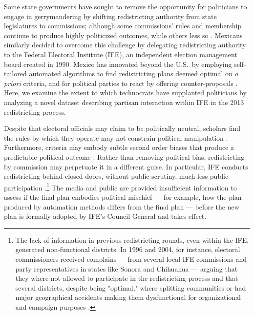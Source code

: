 \documentclass[letter,12pt]{article}
\begin{document}
Some state governments have sought to remove the opportunity for politicians to engage in gerrymandering by shifting redistricting authority from state legislatures to commissions; although some commissions' rules and membership continue to produce highly politicized outcomes, while others less so \citep{mcdonald.CommVsLegisRedistrict2004,trelles.mtz.polygob2012}. Mexicans similarly decided to overcome this challenge by delegating redistricting authority to the Federal Electoral Institute (IFE), an independent election management board created in 1990. Mexico has innovated beyond the U.S.\ by employing self-tailored automated algorithms to find redistricting plans deemed optimal on \emph{a priori} criteria, and for political parties to react by offering counter-proposals \citep{trelles.mtz.polygob2012}. Here, we examine the extent to which technocrats have supplanted politicians \citep{lujambio.vives.2008} by analyzing a novel dataset describing partisan interaction within IFE in the 2013 redistricting process.

Despite that electoral officials may claim to be politically neutral, scholars find the rules by which they operate may not constrain political manipulation \citep{lijphart.1990,rossiter.etal.1997,estevez.magar.rosas.2008}. Furthermore, criteria may embody subtle second order biases that produce a predictable political outcome \citep{parker.1990}. Rather than removing political bias, redistricting by commission may perpetuate it in a different guise. In particular, IFE conducts redistricting behind closed doors, without public scrutiny, much less public participation \citep{trelles.mtz.tesisItam.2007}.\footnote{The lack of information in previous redistricting rounds, even within the IFE, generated non-functional districts. In 1996 and 2004, for instance, electoral commissioners received complains --- from several local IFE commissions and party representatives in states like Sonora and Chihuahua --- arguing that they where not allowed to participate in the redistricting process and that several districts, despite being "optimal," where splitting communities or had major geographical accidents making them dysfunctional for organizational and campaign purposes \citep{trelles.mtz.tesisItam.2007}.} The media and public are provided insufficient information to assess if the final plan embodies political mischief --- for example, how the plan produced by automation methods differs from the final plan --- before the new plan is formally adopted by IFE's Council General and takes effect.
\end{document}
